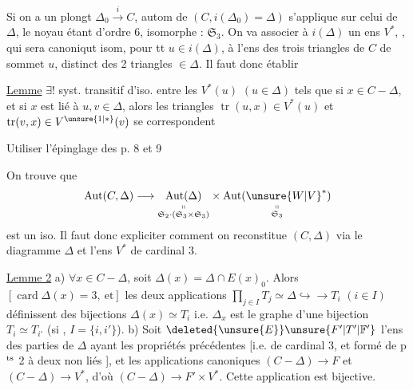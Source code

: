Si on a un plongt $\Delta_0\xrightarrow{i} C$,   autom de $(C,i(\Delta_0)=\Delta)$ s'applique sur celui de $\Delta$, le noyau étant d'ordre 6, isomorphe : $\mathfrak S_3$. On va associer à $i(\Delta)$ un ens $V^*$, , qui sera canoniqut isom, pour tt $u\in i(\Delta)$, à  l'ens  des trois triangles de $C$ de sommet $u$, distinct des 2 triangles $\in\Delta$. Il faut donc établir

\uline{Lemme} \quad $\exists!$ syst. transitif d'iso. entre les $V^*(u)$ $(u\in\Delta)$ tels que si $x\in C-\Delta$, et si $x$ est lié à $u,v\in\Delta$, alors les triangles $\operatorname{tr}(u,x)\in V^*(u)$ et $\operatorname{tr}(v,x)\in V^{\unsure{1|*}}(v)$ se correspondent

Utiliser l'épinglage des p. 8 et 9

On trouve que
\[
\operatorname{Aut}(C,\Delta)\longrightarrow
\underset{\substack{\shortparallel\\\mathfrak S_2\cdot(\mathfrak S_3\times\mathfrak S_3)}}{\operatorname{Aut}(\Delta)}
\times\underset{\substack{\shortparallel\\\mathfrak S_3}}{\operatorname{Aut}(\unsure{W|V}^*)}
\]
est un iso. Il faut donc expliciter comment on reconstitue $(C,\Delta)$
via le diagramme $\Delta$ et l'ens $V^*$ de cardinal 3.

\uline{Lemme 2} \quad a) $\forall x\in C-\Delta$, soit $\Delta(x)=\Delta\cap E(x)_0$. Alors $[\operatorname{card}\Delta(x)=3,\ \text{et}]$ les deux applications $\prod_{j\in I}T_j\simeq\Delta\hookrightarrow\!\longrightarrow T_i$ $(i\in I)$ définissent des bijections $\Delta(x)\simeq T_i$ i.e. $\Delta_x$ est le graphe d'une bijection $T_i\simeq T_{i'}$ (si , $I=\{i,i'\}$).
b) Soit  $\deleted{\unsure{E}}\unsure{F'|T'|\mathbb F'}$ l'ens des parties  de $\Delta$  ayant les propriétés précédentes [i.e. de cardinal 3, et formé de p$^{\rm ts}$ 2 à deux non liés ], et  les applications canoniques $(C-\Delta)\longrightarrow F$ et $(C-\Delta)\longrightarrow V^*$, d'où $(C-\Delta)\longrightarrow F'\times V^*$. Cette application est bijective.


